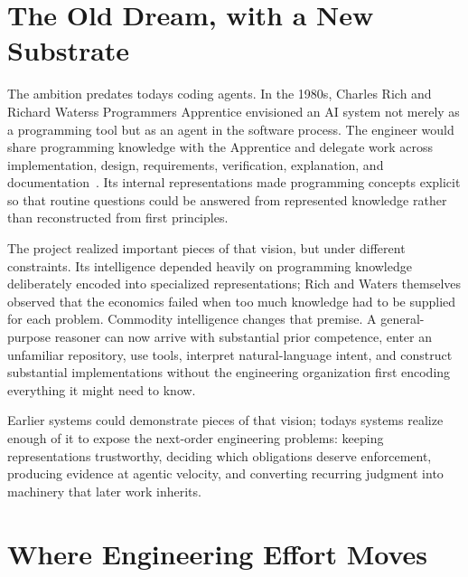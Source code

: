 \section{The Old Dream, with a New Substrate}\label{heading:the-old-dream-with-a-new-substrate}


The ambition predates today\textquotesingle s coding agents. In the 1980s, Charles Rich and Richard Waters\textquotesingle s Programmer\textquotesingle s Apprentice envisioned an AI system not merely as a programming tool but as an agent in the software process. The engineer would share programming knowledge with the Apprentice and delegate work across implementation, design, requirements, verification, explanation, and documentation~\citep{rich-waters}. Its internal representations made programming concepts explicit so that routine questions could be answered from represented knowledge rather than reconstructed from first principles.

The project realized important pieces of that vision, but under different constraints. Its intelligence depended heavily on programming knowledge deliberately encoded into specialized representations; Rich and Waters themselves observed that the economics failed when too much knowledge had to be supplied for each problem. Commodity intelligence changes that premise. A general-purpose reasoner can now arrive with substantial prior competence, enter an unfamiliar repository, use tools, interpret natural-language intent, and construct substantial implementations without the engineering organization first encoding everything it might need to know.

Earlier systems could demonstrate pieces of that vision; today\textquotesingle s systems realize enough of it to expose the next-order engineering problems: keeping representations trustworthy, deciding which obligations deserve enforcement, producing evidence at agentic velocity, and converting recurring judgment into machinery that later work inherits.

\section{Where Engineering Effort Moves}\label{heading:where-engineering-effort-moves}

